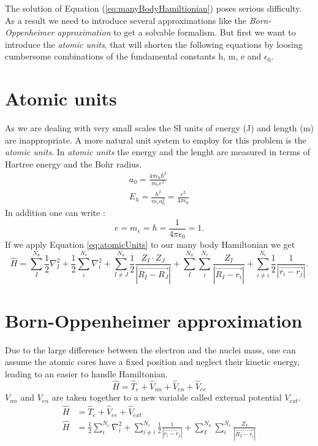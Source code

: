 		 The solution of Equation (\ref{eq:manyBodyHamiltionian}) poses serious difficulty. As a result we need to introduce several approximations like the \textit{Born-Oppenheimer approximation} to get a solvable formalism. But first we want to introduce the \textit{atomic units}, that will shorten the following equations by loosing cumbersome combinations of the fundamental constants h, m, e and $\epsilon_0$.

	\section{Atomic units}
		\label{sec:atomicUnits}
		As we are dealing with very small scales the SI units of energy (J) and length (m) are inappropriate. A more natural unit system to employ for this problem is the \textit{atomic units}.
		In \textit{atomic units} the energy and the lenght are measured in terms of Hartree energy and the Bohr radius.
		\begin{gather}
			a_0 = \frac{4 \pi \epsilon_0 \hbar^2}{m_e e^2} \\
			E_h = \frac{\hbar^2}{m_e a_0^2} = \frac{e^2}{4 \pi \epsilon_0}		
		\end{gather}
		In addition one can write :
		\begin{equation}
			\label{eq:atomicUnits}
			e = m_e = \hbar = \frac{1}{4\pi\epsilon_0} = 1.
		\end{equation}
		If we apply Equation \ref{eq:atomicUnits} to our many body Hamiltonian we get 
		\begin{equation}
				\hat H = \sum_{I}^{N_n}\frac{1}{2} \nabla_I^2 + \frac{1}{2} \sum_{i}^{N_e} \nabla_i^2 + \sum_{I \neq J}^{N_n} \frac{1}{2} \frac{Z_I \cdot Z_J}{|\vec{R_I - R_J}|} + \sum_{I}^{N_n} \sum_{i}^{N_e}  \frac{Z_I}{|\vec{R_I - r_i}|} + \sum_{i \neq i}^{N_e} \frac{1}{2} \frac{1}{|\vec{r_i - r_j}|}.
		\end{equation}	

	\section{Born-Oppenheimer approximation}
		\label{sec:bornOppenheimer}
		Due to the large difference between the electron and the nuclei mass, one can assume the atomic cores have a fixed position and neglect their kinetic energy, leading to an easier to handle Hamiltonian.
		\begin{equation}
			\hat H = \hat T_e + \hat V_{nn} + \hat V_{en} + \hat V_{ee}		
		\end{equation}
		$V_{nn}$ and $V_{en}$ are taken together to a new variable called external potential $V_{ext}$.
		\begin{equation}
			\begin{split}
				\hat H &= \hat T_e + \hat V_{ee} + \hat V_{ext} \\
				\hat H &= \frac{1}{2} \sum_{i}^{N_e} \nabla_i^2 + \sum_{i \neq i}^{N_e} \frac{1}{2} \frac{1}{|\vec{r_i - r_j}|} + \sum_{I}^{N_n} \sum_{i}^{N_e}  \frac{Z_I}{|\vec{R_I - r_i}|}  			
			\end{split}
		\end{equation}
				
